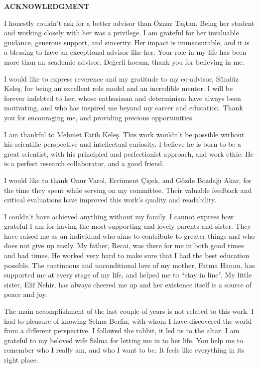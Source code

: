 \clearpage
\setlength{\parindent}{0pt}
\begin{center}
	\MakeUppercase{\textbf{acknowledgment}} \\ [3\baselineskip]
\end{center}

I honestly couldn't ask for a better advisor than Öznur Taştan.
Being her student and working closely with her was a privilege.
I am grateful for her invaluable guidance, generous support, and sincerity.
Her impact is immeasurable, and it is a blessing to have an exceptional advisor like her.
Your role in my life has been more than an academic advisor.
Değerli hocam, thank you for believing in me.

I would like to express reverence and my gratitude to my co-advisor, Sündüz Keleş, for being an excellent role model and an incredible mentor.
I will be forever indebted to her, whose enthusiasm and determinism have always been motivating, and who has inspired me beyond my career and education.
Thank you for encouraging me, and providing precious opportunities.

I am thankful to Mehmet Fatih Keleş.
This work wouldn't be possible without his scientific perspective and intellectual curiosity.
I believe he is born to be a great scientist, with his principled and perfectionist approach, and work ethic.
He is a perfect research collaborator, and a good friend.

I would like to thank Onur Varol, Ercüment Çiçek, and Gözde Bozdağı Akar, for the time they spent while serving on my committee.
Their valuable feedback and critical evaluations have improved this work's quality and readability.


I couldn't have achieved anything without my family.
I cannot express how grateful I am for having the most supporting and lovely parents and sister.
They have raised me as an individual who aims to contribute to greater things and who does not give up easily.
My father, Recai, was there for me in both good times and bad times.
He worked very hard to make sure that I had the best education possible.
The continuous and unconditional love of my mother, Fatma Hanım, has supported me at every stage of my life, and helped me to ``stay in line''.
My little sister, Elif Nehir, has always cheered me up and her existence itself is a source of peace and joy.

The main accomplishment of the last couple of years is not related to this work.
I had to pleasure of knowing Selma Berfin, with whom I have discovered the world from a different perspective.
I followed the rabbit, it led us to the altar.
I am grateful to my beloved wife Selma for letting me in to her life.
You help me to remember who I really am, and who I want to be.
It feels like everything in its right place.
